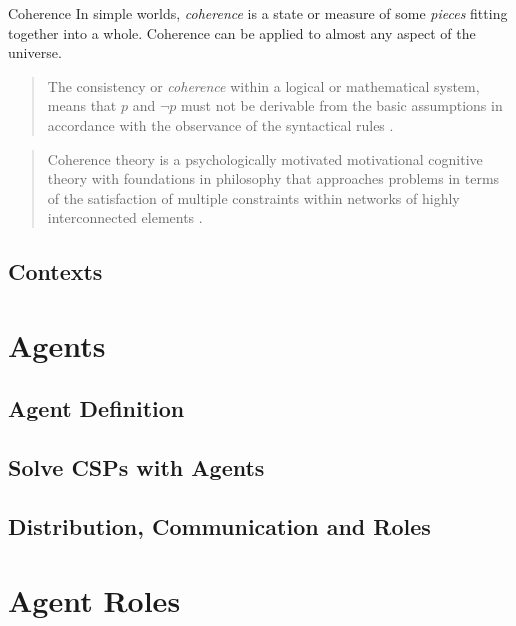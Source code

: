 \documentclass{beamer}
\begin{document}
\begin{frame}
  \begin{block}{Coherence}
    In simple worlds, \emph{coherence} is a state or measure of some \emph{pieces}
    fitting together into a whole. Coherence can be applied to almost any aspect of
    the universe.
  \end{block}
  \begin{quote}
    The consistency or \emph{coherence} within a logical or mathematical
    system, means that $p$ and $\neg p$ must not be derivable from the
    basic assumptions in accordance with the observance of the syntactical
    rules \cite{Daya60}.
  \end{quote}
  \begin{quote}
    Coherence theory is a psychologically motivated motivational cognitive theory with
    foundations in philosophy that approaches problems in terms of the satisfaction
    of multiple constraints within networks of highly interconnected elements
    \cite[p.~19]{UAB-Thesis}.
  \end{quote}
\end{frame}

\subsection{Contexts}


\section{Agents}
\subsection{Agent Definition}
\subsection{Solve CSPs with Agents}
\subsection{Distribution, Communication and Roles}

\section{Agent Roles}
\end{document}
